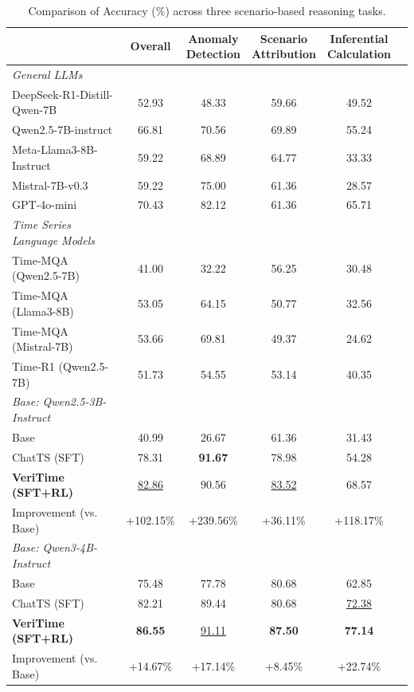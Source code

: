 \documentclass{article}
\theoremstyle{plain}
\theoremstyle{definition}
\theoremstyle{remark}
\begin{document}
\begin{table}[htbp]
\centering
\vspace{-0.5em}
\caption{Comparison of Accuracy (\%) across three scenario-based reasoning tasks.}
\label{tab:main_scene}
\vspace{-0.75em}
\setlength{\tabcolsep}{1.2pt}
\scriptsize
\begin{tabular}{lccccc}
\toprule
 & Overall & \makecell{Anomaly\\Detection} & \makecell{Scenario\\Attribution} & \makecell{Inferential\\Calculation} \\
\midrule
\textit{General LLMs}  \\
DeepSeek-R1-Distill-Qwen-7B & 52.93 & 48.33 & 59.66 & 49.52 \\
Qwen2.5-7B-instruct & 66.81 & 70.56 & 69.89 & 55.24 \\
Meta-Llama3-8B-Instruct & 59.22 & 68.89 & 64.77 & 33.33 \\
Mistral-7B-v0.3 & 59.22 & 75.00 & 61.36 & 28.57 \\
GPT-4o-mini & 70.43 & 82.12 & 61.36 & 65.71 \\
\midrule
\textit{Time Series Language Models}  \\
Time-MQA (Qwen2.5-7B) & 41.00 & 32.22 & 56.25 & 30.48 \\
Time-MQA (Llama3-8B) & 53.05 & 64.15 & 50.77 & 32.56 \\
Time-MQA (Mistral-7B) & 53.66 & 69.81 & 49.37 & 24.62 \\
Time-R1 (Qwen2.5-7B) & 51.73 & 54.55 & 53.14 & 40.35 \\
\midrule
\textit{Base: Qwen2.5-3B-Instruct} \\
Base & 40.99 & 26.67 & 61.36 & 31.43 \\
ChatTS (SFT) & 78.31 & \textbf{91.67} & 78.98 & 54.28 \\
\textbf{VeriTime (SFT+RL)} & \underline{82.86} & 90.56 & \underline{83.52} & 68.57 \\
\rowcolor{cyan!10} Improvement (vs. Base) & +102.15\% & +239.56\% & +36.11\% & +118.17\% & \\
\midrule
\textit{Base: Qwen3-4B-Instruct} \\
Base & 75.48 & 77.78 & 80.68 & 62.85 \\
ChatTS (SFT) & 82.21 & 89.44 & 80.68 & \underline{72.38} \\
\textbf{VeriTime (SFT+RL)} & \textbf{86.55} & \underline{91.11} & \textbf{87.50} & \textbf{77.14} \\
\rowcolor{cyan!10} Improvement (vs. Base) & +14.67\% & +17.14\% & +8.45\% & +22.74\% & \\
\bottomrule
\end{tabular}
\vspace{-1em}
\end{table}
\vspace{-0.5em}
\end{document}
